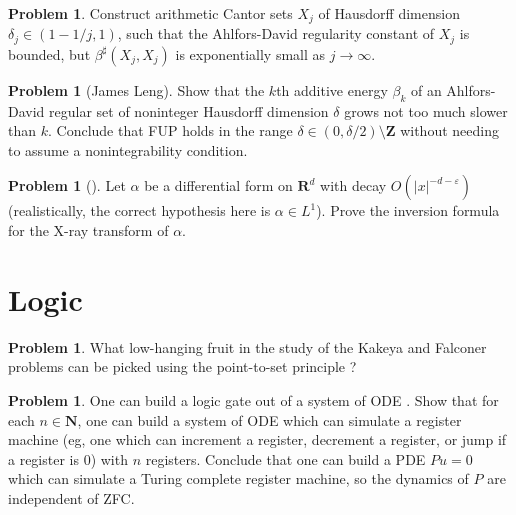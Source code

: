 \documentclass[reqno,11pt]{amsart}
\newcommand{\NN}{\mathbf{N}}
\newcommand{\ZZ}{\mathbf{Z}}
\newcommand{\RR}{\mathbf{R}}
\theoremstyle{definition}
\newtheorem{problem}[theorem]{Problem}
\numberwithin{equation}{section}
\begin{document}
\begin{problem}
Construct arithmetic Cantor sets $X_j$ of Hausdorff dimension $\delta_j \in (1 - 1/j, 1)$, such that the Ahlfors-David regularity constant of $X_j$ is bounded, but $\beta^\sharp(X_j, X_j)$ is exponentially small as $j \to \infty$.
\end{problem}

\begin{problem}[James Leng]
Show that the $k$th additive energy $\beta_k$ of an Ahlfors-David regular set of noninteger Hausdorff dimension $\delta$ grows not too much slower than $k$.
Conclude that FUP holds in the range $\delta \in (0, \delta/2) \setminus \ZZ$ without needing to assume a nonintegrability condition.
\end{problem}

\begin{problem}[{\cite{Solomon11}}]
Let $\alpha$ be a differential form on $\RR^d$ with decay $O(|x|^{-d-\varepsilon})$ (realistically, the correct hypothesis here is $\alpha \in L^1$).
Prove the inversion formula for the X-ray transform of $\alpha$.
\end{problem}


\section{Logic}
\begin{problem}
What low-hanging fruit in the study of the Kakeya and Falconer problems can be picked using the point-to-set principle \cite{Lutz18}?
\end{problem}

\begin{problem}
One can build a logic gate out of a system of ODE \cite{Tao16}.
Show that for each $n \in \NN$, one can build a system of ODE which can simulate a register machine (eg, one which can increment a register, decrement a register, or jump if a register is $0$) with $n$ registers.
Conclude that one can build a PDE $Pu = 0$ which can simulate a Turing complete register machine, so the dynamics of $P$ are independent of ZFC.
\end{problem}



\printbibliography
\end{document}
